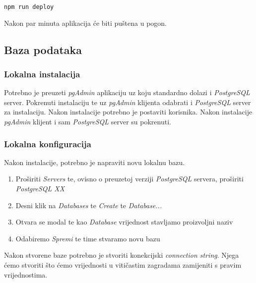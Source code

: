 								\begin{center}
										\texttt{npm run deploy}
								\end{center}
								
								Nakon par minuta aplikacija će biti puštena u pogon.
						
						\pagebreak
		    
				\subsection{Baza podataka}
			
						\subsubsection*{Lokalna instalacija}
						
								Potrebno je preuzeti \textit{pgAdmin} aplikaciju uz koju standardno dolazi i \textit{PostgreSQL} server. Pokrenuti instalaciju te uz \textit{pgAdmin} klijenta odabrati i \textit{PostgreSQL} server za instalaciju. Nakon instalacije potrebno je postaviti korisnika. Nakon instalacije \textit{pgAdmin} klijent i sam \textit{PostgreSQL} server su pokrenuti.
								
						\subsubsection*{Lokalna konfiguracija}
								
								Nakon instalacije, potrebno je napraviti novu lokalnu bazu.
								
								\begin{enumerate}
										\item Proširiti \textit{Servers} te, ovisno o preuzetoj verziji \textit{PostgreSQL} servera, proširiti  \textit{PostgreSQL XX}
										\item Desni klik na \textit{Databases} te \textit{Create} te \textit{Database...}
										\item Otvara se modal te kao \textit{Database} vrijednost stavljamo proizvoljni naziv
										\item Odabiremo \textit{Spremi} te time stvaramo novu bazu
								\end{enumerate}
								
								Nakon stvorene baze potrebno je stvoriti konekcijski \textit{connection string}. Njega ćemo stvoriti što ćemo vrijednosti u vitičastim zagradama zamijeniti s pravim vrijednostima.
								
